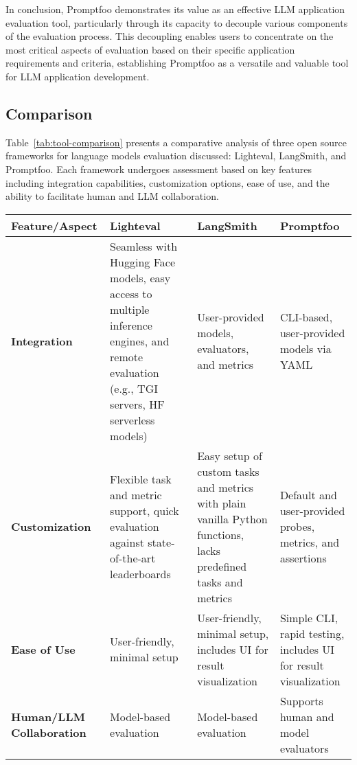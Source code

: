 In conclusion, Promptfoo demonstrates its value as an effective LLM application evaluation tool, particularly through its capacity to decouple various components of the evaluation process. This decoupling enables users to concentrate on the most critical aspects of evaluation based on their specific application requirements and criteria, establishing Promptfoo as a versatile and valuable tool for LLM application development.

\subsection{Comparison}

Table~\ref{tab:tool-comparison} presents a comparative analysis of three open source frameworks for language models evaluation discussed: Lighteval, LangSmith, and Promptfoo. Each framework undergoes assessment based on key features including integration capabilities, customization options, ease of use, and the ability to facilitate human and LLM collaboration.
\begin{table*}[h]
\centering
\begin{tabular}{lp{3cm}p{3cm}p{3cm}}
\hline
\textbf{Feature/Aspect} & \textbf{Lighteval} & \textbf{LangSmith} & \textbf{Promptfoo} \\
\hline
\textbf{Integration} & Seamless with Hugging Face models, easy access to multiple inference engines, and remote evaluation (e.g., TGI servers, HF serverless models) & User-provided models, evaluators, and metrics & CLI-based, user-provided models via YAML \\
\hline
\textbf{Customization} & Flexible task and metric support, quick evaluation against state-of-the-art leaderboards & Easy setup of custom tasks and metrics with plain vanilla Python functions, lacks predefined tasks and metrics & Default and user-provided probes, metrics, and assertions \\
\hline
\textbf{Ease of Use} & User-friendly, minimal setup & User-friendly, minimal setup, includes UI for result visualization & Simple CLI, rapid testing, includes UI for result visualization \\
\hline
\textbf{Human/LLM Collaboration} & Model-based evaluation & Model-based evaluation & Supports human and model evaluators \\
\hline
\end{tabular}
\caption{Comparison of Lighteval, LangSmith, and Promptfoo}
\label{tab:tool-comparison}
\end{table*}

